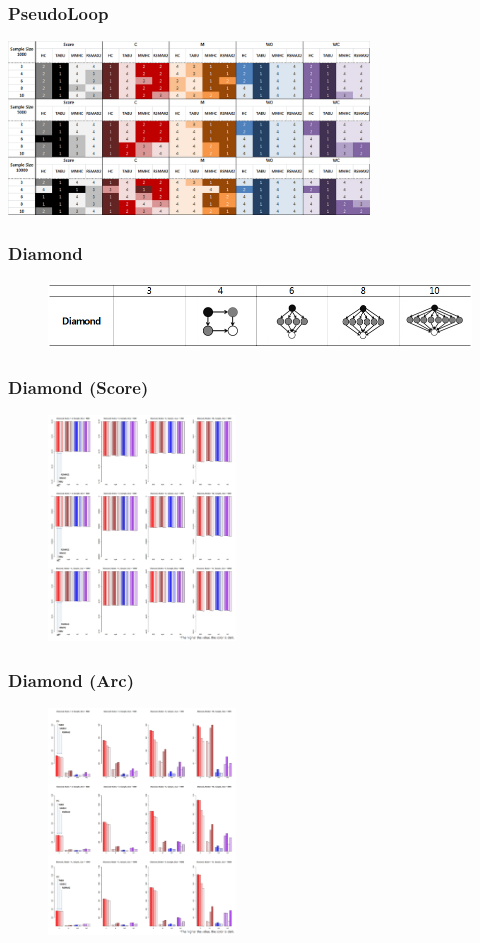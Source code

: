 \documentclass{beamer}
\begin{document}
\begin{frame}
\frametitle{PseudoLoop}
{\scriptsize{}
	\begin{center}
		\includegraphics[height=130pt]{images/Result_PseudoLoop}
	\end{center}
}
\end{frame}




\begin{frame}
\frametitle{Diamond}
{\scriptsize{}
	\begin{figure}
		\includegraphics[height=50pt]{images/Topologies_Diamond}
	\end{figure}	
}
\end{frame}



\begin{frame}
\frametitle{Diamond (Score)}
{\scriptsize{}
	\begin{figure}
		\includegraphics[height=170pt]{images/05_Diamond_Score}
	\end{figure}	
}
\end{frame}


\begin{frame}
\frametitle{Diamond (Arc)}
{\scriptsize{}
	\begin{figure}
		\includegraphics[height=170pt]{images/05_Diamond_Arcs}
	\end{figure}	
}
\end{frame}
\end{document}
